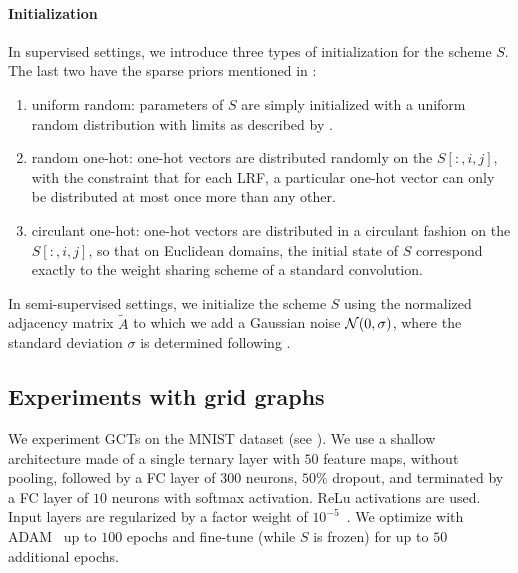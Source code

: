\paragraph{Initialization}
In supervised settings, we introduce three types of initialization for the scheme $S$. The last two have the sparse priors mentioned in :
\begin{enumerate}
  \item uniform random: parameters of $S$ are simply initialized with a uniform random distribution with limits as described by \cite{glorot2010understanding}.
  \item random one-hot: one-hot vectors are distributed randomly on the $S[:,i,j]$, with the constraint that for each LRF, a particular one-hot vector can only be distributed at most once more than any other.
  \item circulant one-hot: one-hot vectors are distributed in a circulant fashion on the $S[:,i,j]$, so that on Euclidean domains, the initial state of $S$ correspond exactly to the weight sharing scheme of a standard convolution.
\end{enumerate}

In semi-supervised settings, we initialize the scheme $S$ using the normalized adjacency matrix $\widetilde{A}$ to which we add a Gaussian noise $\mathcal{N}(0,\sigma)$, where the standard deviation $\sigma$ is determined following \cite{glorot2010understanding}.

\subsection{Experiments with grid graphs}

We experiment GCTs on the MNIST dataset (see ). We use a shallow architecture made of a single ternary layer with $50$ feature maps, without pooling, followed by a FC layer of $300$ neurons, $50\%$ dropout, and terminated by a FC layer of $10$ neurons with softmax activation. ReLu activations are used. Input layers are regularized by a factor weight of $10^{-5}$~\citep{ng2004feature}. We optimize with ADAM~\citep{kingma2014adam} up to $100$ epochs and fine-tune (while $S$ is frozen) for up to $50$ additional epochs.

